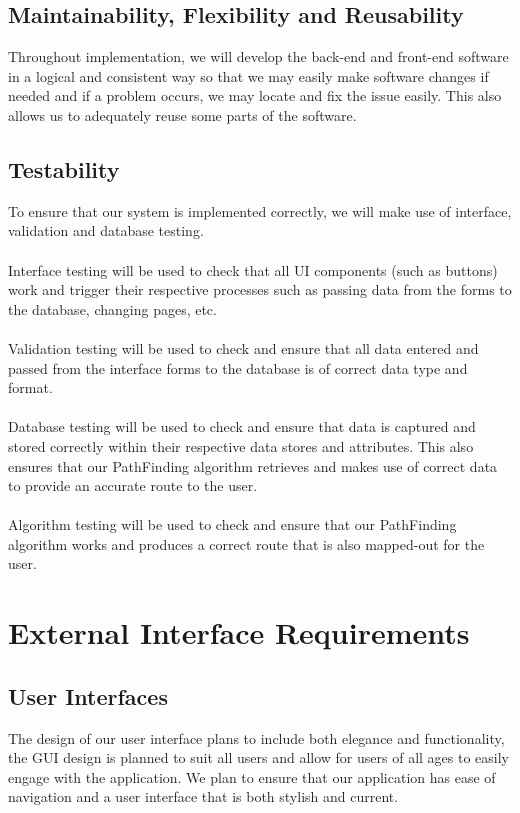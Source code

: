 \documentclass[12pt]{article}
\begin{document}
\subsection{Maintainability, Flexibility and Reusability}
Throughout implementation, we will develop the back-end and front-end software in a logical and consistent way so that we may easily make software changes if needed and if a problem occurs, we may locate and fix the issue easily. This also allows us to adequately reuse some parts of the software.
\subsection{Testability}
To ensure that our system is implemented correctly, we will make use of interface, validation and database testing.\\\\
Interface testing will be used to check that all UI components (such as buttons) work and trigger their respective processes such as passing data from the forms to the database, changing pages, etc.\\\\
Validation testing will be used to check and ensure that all data entered and passed from the interface forms to the database is of correct data type and format.\\\\
Database testing will be used to check and ensure that data is captured and stored correctly within their respective data stores and attributes. This also ensures that our PathFinding algorithm retrieves and makes use of correct data to provide an accurate route to the user.\\\\
Algorithm testing will be used to check and ensure that our PathFinding algorithm works and produces a correct route that is also mapped-out for the user.
\section{External Interface Requirements}
\subsection{User Interfaces}
The design of our user interface plans to include both elegance and functionality, the GUI design is planned to suit all users and allow for users of all ages to easily engage with the application. We plan to ensure that our application has ease of navigation and a user interface that is both stylish and current.
\end{document}
